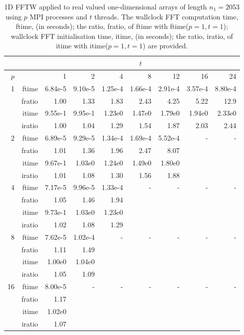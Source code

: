 \documentclass[a4]{article}
\begin{document}
\begin{table}
\begin{center}
\begin{tabular}{|r|r|r|r|r|r|r|r|r|}
\hline 
     &  & \multicolumn{7}{c|}{$t$} \\ \hline
    $p$  &  & 1           & 2    & 4    & 8    & 12   & 16    & 24  \\ \hline\hline
    1  & ftime & 6.84e-5 &  9.10e-5 &  1.25e-4 &  1.66e-4 &  2.91e-4 &  3.57e-4 &  8.80e-4  \\ 
      & fratio & 1.00 &    1.33 &    1.83 &    2.43 &    4.25 &    5.22 &    12.9 \\
     & itime & 9.55e-1 &   9.95e-1 &   1.23e0 &   1.47e0 &   1.79e0 &   1.94e0 &   2.33e0 \\ 
     & iratio & 1.00 &   1.04 &   1.29 &   1.54 &   1.87 &   2.03 &   2.44   \\  \hline
    2  & ftime & 6.89e-5 &  9.29e-5 &  1.34e-4 &  1.69e-4 &  5.52e-4  & - & - \\ 
      & fratio &  1.01 &    1.36 &    1.96 &    2.47 &    8.07     &  &  \\
      & itime &  9.67e-1 &   1.03e0 &   1.24e0 &   1.49e0 &   1.80e0  &  &  \\
      & iratio &  1.01 &   1.08 &   1.30 &   1.56 &   1.88  &  &  \\ \hline
    4  & ftime & 7.17e-5 &  9.96e-5 &  1.33e-4  & - & - & - & - \\ 
      & fratio &  1.05 &    1.46 &    1.94    &  &  &  &  \\
      & itime &  9.73e-1 &   1.03e0 &   1.23e0   &  & & & \\
      & iratio & 1.02 &   1.08 &   1.29   &  & & &  \\ \hline
    8  & ftime &7.62e-5 &  1.02e-4  & - & - & - & - & - \\ 
      & fratio & 1.11 &    1.49    &  &  &  &  &  \\
      & itime &  1.00e0 &   1.04e0  &  & & & & \\
      & iratio &  1.05 &   1.09   &  & & & & \\ \hline
    16 & ftime  &    8.00e-5  & - & - & - & - & - & - \\ 
     & fratio &     1.17   &  &  &  &  &  &  \\
      & itime & 1.02e0   & & & & & & \\
      & iratio & 1.07  & & & & & & \\ \hline
\end{tabular}
\caption{1D FFTW applied to real valued one-dimensional arrays of length $n_1=2053$ using $p$ MPI processes and $t$ threads. The wallclock FFT computation time, ftime, (in seconds); the ratio, fratio, of ftime  with ftime($p=1,t=1$); wallclock FFT initialisation time, itime, (in seconds); the ratio, iratio, of itime  with itime($p=1,t=1$) are provided. }\label{Tbl:FFT1d2053}
\end{center}
\end{table}
\end{document}
